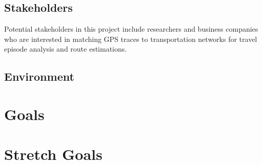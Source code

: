 \documentclass{article}
\begin{document}
\subsection{Stakeholders}
Potential stakeholders in this project include researchers and business companies who are interested in matching GPS traces to 
transportation networks for travel episode analysis and route estimations.

\subsection{Environment}


\section{Goals}

\section{Stretch Goals}
\end{document}
